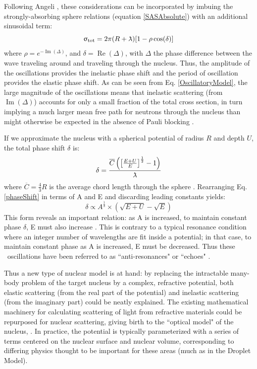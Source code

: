 Following Angeli \cite{Angeli1970}, these considerations can be incorporated by
imbuing the strongly-absorbing sphere relations (equation \ref{SASAbsolute}) with an additional sinusoidal term:
\begin{equation} \label{OscillatoryModel}
    \tot = 2\pi (R+\lambdabar)[1 - \rho \cos(\delta)]
\end{equation}
where $\rho = e^{-\operatorname{Im}(\Delta)}$, and $\delta =
\operatorname{Re}(\Delta)$, with $\Delta$ the phase difference between the wave traveling
around and traveling through the nucleus. Thus, the amplitude of the oscillations provides the 
inelastic phase shift and the period of oscillation provides the elastic phase shift.
As can be seen from Eq. \ref{OscillatoryModel}, the large magnitude of the oscillations means that 
inelastic scattering (from $\operatorname{Im}(\Delta)$) accounts for only a small fraction of the 
total cross section, in turn implying a much larger mean free path for neutrons through the nucleus 
than might otherwise be expected in the absence of Pauli blocking \cite{Mohr1955}.

If we approximate the nucleus with a
spherical potential of radius $R$ and depth $U$, the total phase shift $\delta$ is:
\begin{equation} \label{phaseShift}
    \delta =
    \frac{\overline{C}\left(\left[{\frac{E+U}{E}}\right]^{\frac{1}{2}}-1\right)}{\lambdabar}
\end{equation}
where $\overline{C} = \frac{4}{3}R$ is the average chord length through the
sphere \cite{Angeli1970}. Rearranging Eq. \ref{phaseShift} in terms of A and E and
discarding leading constants yields:
\begin{equation}
    \delta \propto A^{\frac{1}{3}}\times\left(\sqrt{E+U}-\sqrt{E}\right)
\end{equation}
This form reveals an important relation: as A is increased, to maintain constant 
phase $\delta$, E must also increase \cite{Satchler1980, Peterson1962}. 
This is contrary to a typical resonance condition where an integer number of wavelengths
are fit inside a potential; in that case, to maintain constant phase as A is increased,
E must be decreased. Thus these \tot\ oscillations have been referred to as
``anti-resonances" or ``echoes" \cite{Satchler1980, McVoy1967}.

Thus a new type of nuclear model is at hand: by replacing the intractable many-body problem
of the target nucleus by a complex, refractive potential, both elastic scattering (from the real 
part of the potential) and inelastic scattering (from the imaginary part) could be neatly 
explained. The existing mathematical machinery for calculating scattering of light from
refractive materials could be repurposed for nuclear scattering, giving birth to
the ``optical model" of the nucleus, \cite{Feshbach1958, McVoy1967}. In
practice, the potential is typically parameterized with a series of
terms centered on the nuclear surface and nuclear volume,
corresponding to differing physics thought to be important for these areas (much
as in the Droplet Model).

